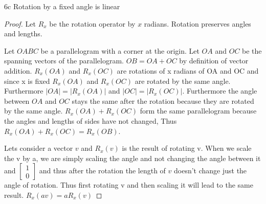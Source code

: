 \documentclass{article}
\newcommand{\abs}[1]{\lvert #1\rvert}
\begin{document}
\begin{claim}{6c}
    Rotation by a fixed angle is linear
\end{claim}
\begin{proof}
    Let $R_x$ be the rotation operator by $x$ radians. Rotation preserves angles and lengths. 
    
    Let $OABC$ be a parallelogram with a corner at the origin. Let $OA$ and $OC$ be the spanning vectors of the parallelogram. $OB = OA + OC$ by definition of vector addition. $R_x(OA)$ and $R_x(OC)$ are rotations of x radians of OA and OC and since x is fixed $R_x(OA)$ and $R_x(OC)$ are rotated by the same angle. Furthermore $\abs{OA} = \abs{R_x(OA)}$ and $\abs{OC} = \abs{R_x(OC)}$. Furthermore the angle between $OA$ and $OC$ stays the same after the rotation because they are rotated by the same angle. $R_x(OA) + R_x(OC)$ form the same parallelogram because the angles and lengths of sides have not changed, Thus $R_x(OA) + R_x(OC) = R_x(OB)$.

    Lets consider a vector $v$ and $R_x(v)$ is the result of rotating v. When we scale the v by a, we are simply scaling the angle and not changing the angle between it and $\begin{bmatrix}
        1 \\ 0
    \end{bmatrix}$ and thus after the rotation the length of $v$ doesn't change just the angle of rotation. Thus first rotating v and then scaling it will lead to the same result. $R_x(av) = aR_x(v)$


\end{proof}
\end{document}

